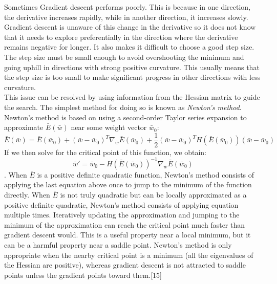 Sometimes Gradient descent performs poorly. This is because in one direction, the derivative increases rapidly, while in another direction, it increases slowly. Gradient descent is unaware of this change in the derivative so it does not know that it needs to explore preferentially in the direction where the derivative remains negative for longer. It also makes it diﬃcult to choose a good step size. The step size must be small enough to avoid overshooting the minimum and going uphill in directions with strong positive curvature. This usually means that the step size is too small to make signiﬁcant progress in other directions with less curvature.\\
This issue can be resolved by using information from the Hessian matrix to guide the search.  The simplest method for doing so is known as \emph{Newton’s method}. Newton’s method is based on using a second-order Taylor series expansion to approximate $\bar{E}(\bar{w})$ near some weight vector $\bar{w}_0$:
$$\bar{E}(\bar{w})=\bar{E}(\bar{w}_0)+(\bar{w}-\bar{w}_0)^T\nabla_{\bar{w}}\bar{E}(\bar{w}_0)+\frac{1}{2}(\bar{w}-\bar{w}_0)^T H(\bar{E}(\bar{w}_0))(\bar{w}-\bar{w}_0)$$
If we then solve for the critical point of this function, we obtain:
$$\bar{w}'=\bar{w}_0-H(\bar{E}(\bar{w}_0))^{-1}\nabla_{\bar{w}}\bar{E}(\bar{w}_0)$$.
When $\bar{E}$ is a positive deﬁnite quadratic function, Newton’s method consists of applying the last equation above once to jump to the minimum of the function directly. When $\bar{E}$ is not truly quadratic but can be locally approximated as a positive deﬁnite quadratic, Newton’s method consists of applying equation multiple times. Iteratively updating the approximation and jumping to the minimum of the approximation can reach the critical point much faster than gradient descent would. This is a useful property near a local minimum, but it can be a harmful property near a saddle point. Newton’s method is only appropriate when the nearby critical point is a minimum (all the eigenvalues of the Hessian are positive), whereas gradient descent is not attracted to saddle points unless the gradient points toward them.[15] 


